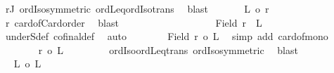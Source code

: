 \begin{isabellebody}
\ rJ\ ordIso{\isacharunderscore}{\kern0pt}symmetric\ ordLeq{\isacharunderscore}{\kern0pt}ordIso{\isacharunderscore}{\kern0pt}trans\ \isamarkupfalse%
\ blast\isanewline
\ \ \ \ \ \isamarkupfalse%
\ {\isachardoublequoteopen}{\isacharbar}{\kern0pt}{\isacharquery}{\kern0pt}L{\isacharbar}{\kern0pt}\ {\isacharless}{\kern0pt}o\ {\isacharquery}{\kern0pt}r{\isacharprime}{\kern0pt}{\isachardoublequoteclose}\ \isamarkupfalse%
\ r{\isacharprime}{\kern0pt}\ card{\isacharunderscore}{\kern0pt}of{\isacharunderscore}{\kern0pt}Card{\isacharunderscore}{\kern0pt}order\ \isamarkupfalse%
\ blast\isanewline
\ \ \ \ \ \isamarkupfalse%
\isanewline
\ \ \ \ \ \isacommand{{\isacharbraceleft}{\kern0pt}}\isamarkupfalse%
\isanewline
\ \ \ \ \ \ \isamarkupfalse%
\ {\isachardoublequoteopen}Field\ {\isacharquery}{\kern0pt}r{\isacharprime}{\kern0pt}\ {\isasymle}\ {\isacharquery}{\kern0pt}L{\isachardoublequoteclose}\isanewline
\ \ \ \ \ \ \isamarkupfalse%
\ {}\ \isamarkupfalse%
\ underS{\isacharunderscore}{\kern0pt}def\ cofinal{\isacharunderscore}{\kern0pt}def\ \isamarkupfalse%
\ auto\isanewline
\ \ \ \ \ \ \isamarkupfalse%
\ {\isachardoublequoteopen}{\isacharbar}{\kern0pt}Field\ {\isacharquery}{\kern0pt}r{\isacharprime}{\kern0pt}{\isacharbar}{\kern0pt}\ {\isasymle}o\ {\isacharbar}{\kern0pt}{\isacharquery}{\kern0pt}L{\isacharbar}{\kern0pt}{\isachardoublequoteclose}\ \isamarkupfalse%
\ {\isacharparenleft}{\kern0pt}simp\ add{\isacharcolon}{\kern0pt}\ card{\isacharunderscore}{\kern0pt}of{\isacharunderscore}{\kern0pt}mono{}{\isacharparenright}{\kern0pt}\isanewline
\ \ \ \ \ \ \isamarkupfalse%
\ {\isachardoublequoteopen}{\isacharquery}{\kern0pt}r{\isacharprime}{\kern0pt}\ {\isasymle}o\ {\isacharbar}{\kern0pt}{\isacharquery}{\kern0pt}L{\isacharbar}{\kern0pt}{\isachardoublequoteclose}\isanewline
\ \ \ \ \ \ \isamarkupfalse%
\ {}{}\ ordIso{\isacharunderscore}{\kern0pt}ordLeq{\isacharunderscore}{\kern0pt}trans\ ordIso{\isacharunderscore}{\kern0pt}symmetric\ \isamarkupfalse%
\ blast\isanewline
\ \ \ \ \ \isacommand{{\isacharbraceright}{\kern0pt}}\isamarkupfalse%
\isanewline
\ \ \ \ \ \isamarkupfalse%
\ \isamarkupfalse%
\ {\isachardoublequoteopen}{\isacharbar}{\kern0pt}{\isacharquery}{\kern0pt}L{\isacharbar}{\kern0pt}\ {\isacharless}{\kern0pt}o\ {\isacharbar}{\kern0pt}{\isacharquery}{\kern0pt}L{\isacharbar}{\kern0pt}{\isachardoublequoteclose}\ \isamarkupfalse%

\end{isabellebody}
